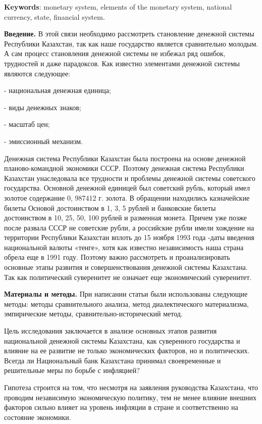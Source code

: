 {\bfseries Keywords}: monetary system, elements of the monetary system,
national currency, state, financial system.

\begin{multicols}{2}
{\bfseries Введение.} В этой связи необходимо рассмотреть становление
денежной системы Республики Казахстан, так как наше государство является
сравнительно молодым. А сам процесс становления денежной системы не
избежал ряд ошибок, трудностей и даже парадоксов. Как известно
элементами денежной системы являются следующее:

- национальная денежная единица;

- виды денежных знаков;

- масштаб цен;

- эмиссионный механизм.

Денежная система Республики Казахстан была построена на основе денежной
планово-командной экономики СССР. Поэтому денежная система Республики
Казахстан унаследовала все трудности и проблемы денежной системы
советского государства. Основной денежной единицей был советский рубль,
который имел золотое содержание 0, 987412 г. золота. В обращении
находились казначейские билеты Основой достоинством в 1, 3, 5 рублей и
банковские билеты достоинством в 10, 25, 50, 100 рублей и разменная
монета. Причем уже позже после развала СССР не советские рубли, а
российские рубли имели хождение на территории Республики Казахстан
вплоть до 15 ноября 1993 года -даты введения национальной валюты
«тенге», хотя как известно независимость наша страна обрела еще в 1991
году. Поэтому важно рассмотреть и проанализировать основные этапы
развития и совершенствования денежной системы Казахстана. Так как
политический суверенитет не означает еще экономический суверенитет.

{\bfseries Материалы и методы.} При написании статьи были использованы
следующие методы: методы сравнительного анализа, метод диалектического
материализма, эмпирические методы, сравнительно-исторический метод.

Цель исследования заключается в анализе основных этапов развития
национальной денежной системы Казахстана, как суверенного государства и
влияние на ее развитие не только экономических факторов, но и
политических. Всегда ли Национальный банк Казахстана принимал
своевременные и решительные меры по борьбе с инфляцией?

Гипотеза строится на том, что несмотря на заявления руководства
Казахстана, что проводим независимую экономическую политику, тем не
менее влияние внешних факторов сильно влияет на уровень инфляции в
стране и соответственно на состояние экономики.


\end{multicols}
